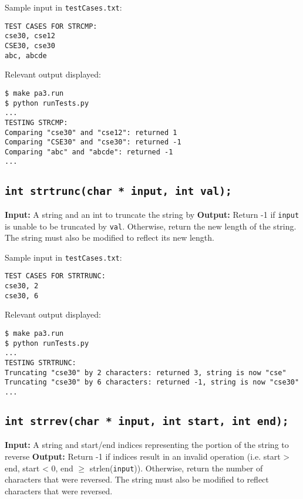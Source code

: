 \documentclass{article}
\begin{document}
\noindent Sample input in {\tt testCases.txt}:
\begin{verbatim}
TEST CASES FOR STRCMP:
cse30, cse12
CSE30, cse30
abc, abcde
\end{verbatim}

\noindent  Relevant output displayed:
\begin{verbatim}
$ make pa3.run
$ python runTests.py 
...
TESTING STRCMP:
Comparing "cse30" and "cse12": returned 1
Comparing "CSE30" and "cse30": returned -1
Comparing "abc" and "abcde": returned -1
...
\end{verbatim}

\subsection{{\tt int strtrunc(char * input, int val);}}
\textbf{Input:} A string and an int to truncate the string by \newline
\textbf{Output:} Return -1 if {\tt input} is unable to be truncated by {\tt val}. Otherwise, return the new length of the string. The string must also be modified to reflect its new length. \newline

\noindent Sample input in {\tt testCases.txt}:
\begin{verbatim}
TEST CASES FOR STRTRUNC:
cse30, 2
cse30, 6
\end{verbatim}

\noindent  Relevant output displayed:
\begin{verbatim}
$ make pa3.run
$ python runTests.py 
...
TESTING STRTRUNC:
Truncating "cse30" by 2 characters: returned 3, string is now "cse"
Truncating "cse30" by 6 characters: returned -1, string is now "cse30"
...
\end{verbatim}

\subsection{{\tt int strrev(char * input, int start, int end);}}
\textbf{Input:} A string and start/end indices representing the portion of the string to reverse \newline
\textbf{Output:} Return -1 if indices result in an invalid operation (i.e. start > end, start < 0, end $\geq$ strlen({\tt input})). Otherwise, return the number of characters that were reversed. The string must also be modified to reflect characters that were reversed. \newline
\end{document}
